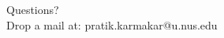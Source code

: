 \documentclass{beamer}
\begin{document}
\begin{frame}
\begin{center}
Questions?\\
Drop a mail at: pratik.karmakar@u.nus.edu
\end{center}
\end{frame}
\end{document}
